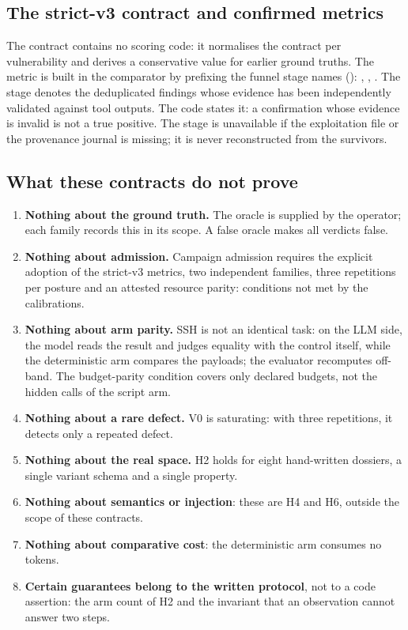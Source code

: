 \subsection{The strict-v3 contract and confirmed metrics}

The contract  contains no scoring code: it
normalises the contract per vulnerability and derives a conservative value for
earlier ground truths. The  metric is built in the comparator by
prefixing the funnel stage names ():
, , . The  stage
denotes the deduplicated findings whose evidence has been independently validated
against tool outputs. The code states it: a confirmation whose evidence is invalid
is not a true positive. The stage is unavailable if the exploitation file or the
provenance journal is missing; it is never reconstructed from the survivors.

\subsection{What these contracts do not prove}

\begin{enumerate}
\item \textbf{Nothing about the ground truth.} The oracle is supplied by the
operator; each family records this in its scope. A false oracle makes all verdicts
false.
\item \textbf{Nothing about admission.} Campaign admission requires the explicit
adoption of the strict-v3 metrics, two independent families, three repetitions
per posture and an attested resource parity: conditions not met by the
calibrations.
\item \textbf{Nothing about arm parity.} SSH is not an identical task: on the LLM
side, the model reads the result and judges equality with the control itself,
while the deterministic arm compares the payloads; the evaluator recomputes
off-band. The budget-parity condition covers only declared budgets, not the
hidden calls of the script arm.
\item \textbf{Nothing about a rare defect.} V0 is saturating: with three
repetitions, it detects only a repeated defect.
\item \textbf{Nothing about the real space.} H2 holds for eight hand-written
dossiers, a single variant schema and a single property.
\item \textbf{Nothing about semantics or injection}: these are H4 and H6, outside
the scope of these contracts.
\item \textbf{Nothing about comparative cost}: the deterministic arm consumes no
tokens.
\item \textbf{Certain guarantees belong to the written protocol}, not to a code
assertion: the arm count of H2 and the invariant that an observation cannot answer
two steps.
\end{enumerate}
